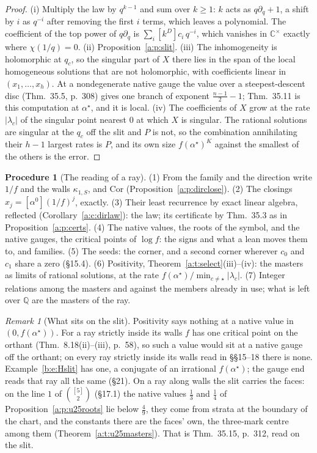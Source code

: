 \documentclass[11pt]{article}
\theoremstyle{plain}
\theoremstyle{definition}
\newtheorem{procedure}[proposition]{Procedure}
\theoremstyle{remark}
\newtheorem{remark}[proposition]{Remark}
\begin{document}
\begin{proof}
(i) Multiply the law by $q^{k-1}$ and sum over $k\ge1$: $k$ acts as $q\partial_q+1$, a shift by $i$ as $q^{-i}$ after removing the first $i$ terms, which leaves a polynomial. The coefficient of the top power of $q\partial_q$ is $\sum_i[k^D]c_i\,q^{-i}$, which vanishes in $\mathbb C^\times$ exactly where $\chi(1/q)=0$. (ii) Proposition~\ref{a:p:slit}. (iii) The inhomogeneity is holomorphic at $q_c$, so the singular part of $X$ there lies in the span of the local homogeneous solutions that are not holomorphic, with coefficients linear in $(x_1,\dots,x_h)$. At a nondegenerate native gauge the value over a steepest-descent disc (Thm.~35.5, p.~308) gives one branch of exponent $\frac{n-1}2-1$; Thm.~35.11 is this computation at $\alpha^\star$, and it is local. (iv) The coefficients of $X$ grow at the rate $|\lambda_c|$ of the singular point nearest $0$ at which $X$ is singular. The rational solutions are singular at the $q_c$ off the slit and $P$ is not, so the combination annihilating their $h-1$ largest rates is $P$, and its own size $f(\alpha^\star)^K$ against the smallest of the others is the error.
\end{proof}

\begin{procedure}[The reading of a ray]\label{a:p:reading}
(1) From the family and the direction write $1/f$ and the walls $\kappa_{1,S}$, and $\mathrm{Cor}$ (Proposition~\ref{a:p:dirclose}). (2) The closings $x_j=[\alpha^0](1/f)^j$, exactly. (3) Their least recurrence by exact linear algebra, reflected (Corollary~\ref{a:c:dirlaw}): the law; its certificate by Thm.~35.3 as in Proposition~\ref{a:p:certs}. (4) The native values, the roots of the symbol, and the native gauges, the critical points of $\log f$: the signs and what a lean moves them to, and families. (5) The seeds: the corner, and a second corner wherever $c_0$ and $c_1$ share a zero (\S15.4). (6) Positivity, Theorem~\ref{a:t:select}(iii)--(iv): the masters as limits of rational solutions, at the rate $f(\alpha^\star)/\min_{c\ne\star}|\lambda_c|$. (7) Integer relations among the masters and against the members already in use; what is left over $\mathbb Q$ are the masters of the ray.
\end{procedure}

\begin{remark}[What sits on the slit]\label{a:r:onslit}
Positivity says nothing at a native value in $(0,f(\alpha^\star))$. For a ray strictly inside its walls $f$ has one critical point on the orthant (Thm.~8.18(ii)--(iii), p.~58), so such a value would sit at a native gauge off the orthant; on every ray strictly inside its walls read in \S\S15--18 there is none. Example~\ref{b:e:Hslit} has one, a conjugate of an irrational $f(\alpha^\star)$; the gauge end reads that ray all the same (\S21). On a ray along walls the slit carries the faces: on the line $1$ of $\binom{[5]}2$ (\S17.1) the native values $\frac13$ and $\frac14$ of Proposition~\ref{a:p:u25roots} lie below $\frac49$, they come from strata at the boundary of the chart, and the constants there are the faces' own, the three-mark centre among them (Theorem~\ref{a:t:u25masters}). That is Thm.~35.15, p.~312, read on the slit.
\end{remark}
\end{document}
